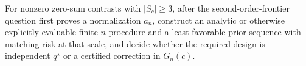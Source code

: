 For nonzero zero-sum contrasts with \(|S_c|\geq3\), after the second-order-frontier question first proves a normalization \(a_n\), construct an analytic or otherwise explicitly evaluable finite-\(n\) procedure and a least-favorable prior sequence with matching risk at that scale, and decide whether the required design is independent \(q^\star\) or a certified correction in \(G_n(c)\).